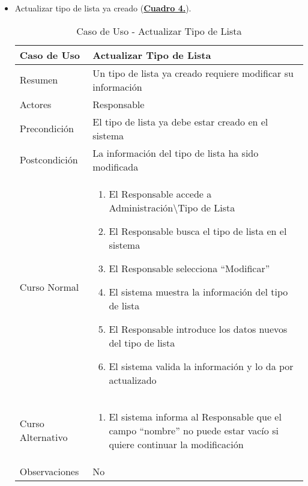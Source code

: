 \begin{itemize}
	\newpage~
	\item \addtocounter{tabla}{1} Actualizar tipo de lista ya creado (\textbf{\hyperref[tab:curActualizarTipoLst]{Cuadro 4.}}).
		\begin{table}[!htbp]
		  \centering  \addtocounter{casouso}{1}
		  \begin{tabular}{|l | p{100mm}|}
		    \textbf{Caso de Uso}  & \textbf{Actualizar Tipo de Lista} \\ \hline
		    Resumen 		 & Un tipo de lista ya creado requiere modificar su información \\ \hline
		    Actores  		 & Responsable \\ \hline
		    Precondición  	 & El tipo de lista ya debe estar creado en el sistema  \\ \hline
		    Postcondición  	 & La información del tipo de lista ha sido modificada \\ \hline
		    Curso Normal   	 & \begin{enumerate}
			  \item El Responsable accede a Administración\textbackslash Tipo de Lista
			  \item El Responsable busca el tipo de lista en el sistema
			  \item El Responsable selecciona ``Modificar''
			  \item El sistema muestra la información del tipo de lista
			  \item El Responsable introduce los datos nuevos del tipo de lista
			  \item El sistema valida la información y lo da por actualizado
		    \end{enumerate}  \\ \hline
		    Curso Alternativo  & \begin{enumerate}
			  \item El sistema informa al Responsable que el campo ``nombre'' no puede estar vacío si quiere continuar la modificación
		    \end{enumerate}  \\ \hline
		    Observaciones 	 & No  \\ \hline
		  \end{tabular}
		  \caption{Caso de Uso  - Actualizar Tipo de Lista}
		  \label{tab:curActualizarTipoLst}
		\end{table}
		\FloatBarrier
\end{itemize}

